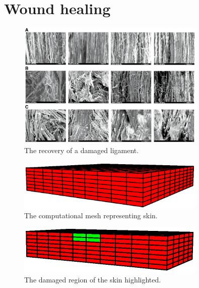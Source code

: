 \section{Wound healing}
\label{wound-healing}

\begin{figure}[!hpt]
\centering
\includegraphics[width=0.8\textwidth]
                {images/experiments/healing-damaged-ligament} 
\caption{The recovery of a damaged ligament.}
\label{healing-damaged-ligament}
\end{figure}

\begin{figure}[!hpt]
\centering
\includegraphics[width=0.8\textwidth]
                {images/examples/lagrangian/healing/full-skin-mesh} 
\caption{The computational mesh representing skin.}
\label{healing-skin-mesh}
\end{figure}

\begin{figure}[!hpt]
\centering
\includegraphics[width=0.8\textwidth]
                {images/examples/lagrangian/healing/damaged-region} 
\caption{The damaged region of the skin highlighted.}
\label{healing-damaged-region}
\end{figure}


